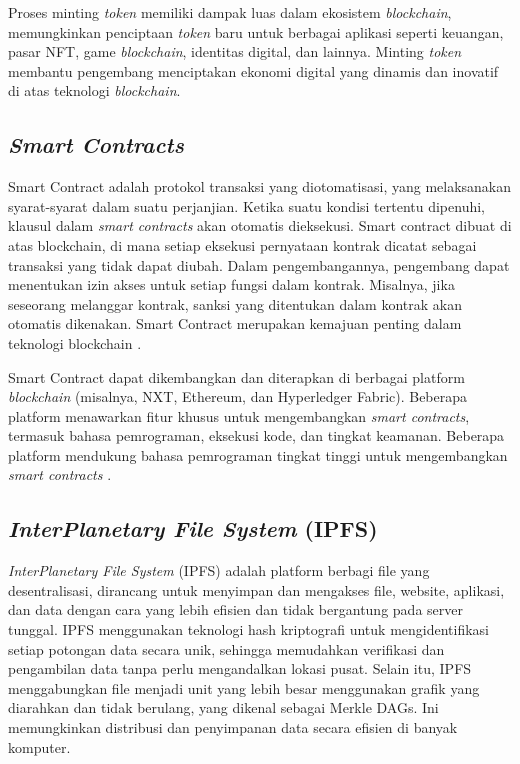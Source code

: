Proses minting \emph{token} memiliki dampak luas dalam ekosistem \emph{blockchain}, memungkinkan penciptaan \emph{token} baru untuk berbagai aplikasi seperti keuangan, pasar NFT, game \emph{blockchain}, identitas digital, dan lainnya. Minting \emph{token} membantu pengembang menciptakan ekonomi digital yang dinamis dan inovatif di atas teknologi \emph{blockchain}. 

\subsection{\emph{Smart Contracts}}
Smart Contract adalah protokol transaksi yang diotomatisasi, yang melaksanakan syarat-syarat dalam suatu perjanjian. Ketika suatu kondisi tertentu dipenuhi, klausul dalam \emph{smart contracts} akan otomatis dieksekusi. Smart contract dibuat di atas blockchain, di mana setiap eksekusi pernyataan kontrak dicatat sebagai transaksi yang tidak dapat diubah. Dalam pengembangannya, pengembang dapat menentukan izin akses untuk setiap fungsi dalam kontrak. Misalnya, jika seseorang melanggar kontrak, sanksi yang ditentukan dalam kontrak akan otomatis dikenakan. Smart Contract merupakan kemajuan penting dalam teknologi blockchain \cite{Zheng2020}.

Smart Contract dapat dikembangkan dan diterapkan di berbagai platform \emph{blockchain} (misalnya, NXT, Ethereum, dan Hyperledger Fabric). Beberapa platform menawarkan fitur khusus untuk mengembangkan \emph{smart contracts}, termasuk bahasa pemrograman, eksekusi kode, dan tingkat keamanan. Beberapa platform mendukung bahasa pemrograman tingkat tinggi untuk mengembangkan \emph{smart contracts} \cite{Khan2021}.

\subsection{\emph{InterPlanetary File System} (IPFS)}
\emph{InterPlanetary File System } (IPFS) adalah platform berbagi file yang desentralisasi, dirancang untuk menyimpan dan mengakses file, website, aplikasi, dan data dengan cara yang lebih efisien dan tidak bergantung pada server tunggal. IPFS menggunakan teknologi hash kriptografi untuk mengidentifikasi setiap potongan data secara unik, sehingga memudahkan verifikasi dan pengambilan data tanpa perlu mengandalkan lokasi pusat. Selain itu, IPFS menggabungkan file menjadi unit yang lebih besar menggunakan grafik yang diarahkan dan tidak berulang, yang dikenal sebagai Merkle DAGs. Ini memungkinkan distribusi dan penyimpanan data secara efisien di banyak komputer.

